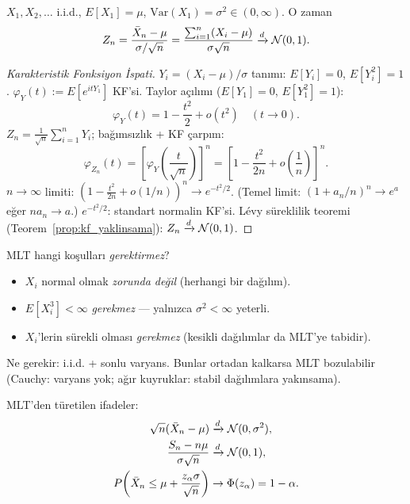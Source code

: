 \begin{teorem}
\label{thm:mlt}
$X_1, X_2, \ldots$ i.i.d., $E[X_1] = \mu$, $\mathrm{Var}(X_1) = \sigma^2 \in (0,\infty)$. O zaman
\[
  Z_n = \frac{\bar{X}_n - \mu}{\sigma/\sqrt{n}} = \frac{\sum_{i=1}^n (X_i - \mu)}{\sigma\sqrt{n}}
  \xrightarrow{d} \mathcal{N}(0,1).
\]
\end{teorem}

\begin{proof}[Karakteristik Fonksiyon İspati]
$Y_i = (X_i - \mu)/\sigma$ tanımı: $E[Y_i] = 0$, $E[Y_i^2] = 1$.
$\varphi_Y(t) := E[e^{itY_1}]$ KF'si. Taylor açılımı ($E[Y_1]=0$, $E[Y_1^2]=1$):
\[
  \varphi_Y(t) = 1 - \frac{t^2}{2} + o(t^2) \quad (t\to 0).
\]
$Z_n = \frac{1}{\sqrt{n}}\sum_{i=1}^n Y_i$; bağımsızlık + KF çarpım:
\[
  \varphi_{Z_n}(t) = \left[\varphi_Y\!\left(\frac{t}{\sqrt{n}}\right)\right]^n
  = \left[1 - \frac{t^2}{2n} + o\!\left(\frac{1}{n}\right)\right]^n.
\]
$n\to\infty$ limiti: $\left(1 - \frac{t^2}{2n} + o(1/n)\right)^n \to e^{-t^2/2}$.
(Temel limit: $(1+a_n/n)^n \to e^a$ eğer $na_n \to a$.)
$e^{-t^2/2}$: standart normalin KF'si.
Lévy süreklilik teoremi (Teorem~\ref{prop:kf_yaklinsama}): $Z_n \xrightarrow{d} \mathcal{N}(0,1)$.
\end{proof}

\begin{kritiksorgu}
MLT hangi koşulları \emph{gerektirmez}?
\begin{itemize}
  \item $X_i$ normal olmak \emph{zorunda değil} (herhangi bir dağılım).
  \item $E[X_i^3] < \infty$ \emph{gerekmez} --- yalnızca $\sigma^2 < \infty$ yeterli.
  \item $X_i$'lerin sürekli olması \emph{gerekmez} (kesikli dağılımlar da MLT'ye tabidir).
\end{itemize}
Ne gerekir: i.i.d. + sonlu varyans. Bunlar ortadan kalkarsa MLT bozulabilir
(Cauchy: varyans yok; ağır kuyruklar: stabil dağılımlara yakınsama).
\end{kritiksorgu}

\begin{onerme}
\label{prop:mlt_form}
MLT'den türetilen ifadeler:
\begin{align*}
  \sqrt{n}(\bar{X}_n - \mu) &\xrightarrow{d} \mathcal{N}(0, \sigma^2), \\
  \frac{S_n - n\mu}{\sigma\sqrt{n}} &\xrightarrow{d} \mathcal{N}(0,1), \\
  P\!\left(\bar{X}_n \leq \mu + \frac{z_\alpha \sigma}{\sqrt{n}}\right) &\to \Phi(z_\alpha) = 1-\alpha.
\end{align*}
\end{onerme}

